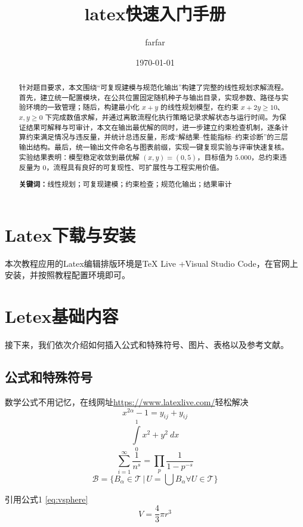 \documentclass[UTF8]{article}%
\title{\heiti\zihao{2} latex快速入门手册}      %
\author{\songti farfar}                     %
\date{\today}                               %
\begin{document}
    \maketitle              %
    \thispagestyle{empty}   %

\begin{abstract}            
    针对题目要求，本文围绕“可复现建模与规范化输出”构建了完整的线性规划求解流程。首先，建立统一配置模块，在公共位置固定随机种子与输出目录，实现参数、路径与实验环境的一致管理；随后，构建最小化 $x+y$ 的线性规划模型，在约束 $x+2y\geq 10$、$x,y\geq 0$ 下完成数值求解，并通过离散流程化执行策略记录求解状态与运行时间。为保证结果可解释与可审计，本文在输出最优解的同时，进一步建立约束检查机制，逐条计算约束满足情况与违反量，并统计总违反量，形成“解结果--性能指标--约束诊断”的三层输出结构。最后，统一输出文件命名与图表前缀，实现一键复现实验与评审快速复核。实验结果表明：模型稳定收敛到最优解 $(x,y)=(0,5)$，目标值为 $5.000$，总约束违反量为 $0$，流程具有良好的可复现性、可扩展性与工程实用价值。

    \textbf{关键词：}线性规划；可复现建模；约束检查；规范化输出；结果审计
\end{abstract}

\tableofcontents

\section{Latex下载与安装}
本次教程应用的Latex编辑排版环境是TeX Live +Visual Studio Code，在官网上安装，并按照教程配置环境即可。

\section{Letex基础内容}
接下来，我们依次介绍如何插入公式和特殊符号、图片、表格以及参考文献。

\subsection{公式和特殊符号}
数学公式不用记忆，在线网址\url{https://www.latexlive.com/}轻松解决 
\[ x^{2 \alpha} - 1 = y_{ij} + y_{ij}  \]
\[ \int\limits_0^1 x^2 + y^2 \ dx \]
\[ \sum_{i=1}^{\infty} \frac{1}{n^s} = \prod_p \frac{1}{1 - p^{-s}} \]
\[\mathcal{B} = \{B_{\alpha} \in \mathcal{T}\, |\,  U = \bigcup B_{\alpha} \forall U \in \mathcal{T} \}\]

引用公式1 \ref{eq:vsphere}
   \begin{equation} %
     \label{eq:vsphere}
       V = \frac{4}{3}\pi r^3
       \end{equation}
\end{document}
